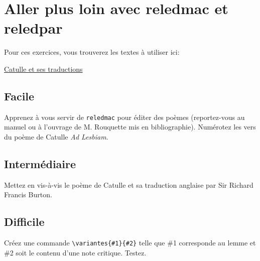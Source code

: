 \documentclass[12pt]{article}
\begin{document}
	
	
	\section*{Aller plus loin avec reledmac et reledpar}

Pour ces exercices, vous trouverez les textes à utiliser ici:

\href{https://neoclassica.co/2020/05/25/le-poeme-ad-lesbiam-de-catulle-traductions-et-imitations/}{Catulle et ses traductions}

\subsection*{Facile}
Apprenez à vous servir de \verb|reledmac| pour éditer des poèmes (reportez-vous au manuel ou à l'ouvrage de M. Rouquette mis en bibliographie). Numérotez les vers du poème de Catulle  \emph{Ad Lesbiam}.



\subsection*{Intermédiaire}
Mettez en vis-à-vis le poème de Catulle et sa traduction anglaise par Sir Richard Francis Burton.

\subsection*{Difficile}
Créez une commande \verb|\variantes{#1}{#2}| telle que \#1 corresponde au lemme et  \#2 soit le contenu d'une note critique. Testez.
\end{document}

